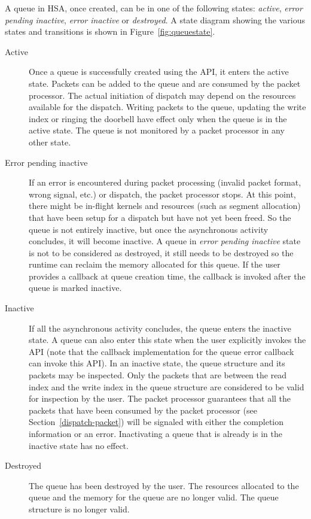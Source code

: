 \documentclass[draft]{book}
\begin{document}
A queue in HSA, once created, can be in one of the following states:
\emph{active}, \emph{error pending inactive}, \emph{error inactive} or
\emph{destroyed}. A state diagram showing the various states and transitions is
shown in Figure~\ref{fig:queuestate}.

\begin{description}
\item[Active] Once a queue is successfully created using the
   API, it enters the active state. Packets can be
  added to the queue and are consumed by the packet processor. The actual
  initiation of dispatch may depend on the resources available for the
  dispatch. Writing packets to the queue, updating the write index or ringing
  the doorbell have effect only when the queue is in the active state. The queue
  is not monitored by a packet processor in any other state.

\item[Error pending inactive] If an error is encountered during packet
  processing (invalid packet format, wrong signal, etc.) or dispatch, the packet
  processor stops. At this point, there might be in-flight kernels and resources
  (such as segment allocation) that have been setup for a dispatch but have not
  yet been freed. So the queue is not entirely inactive, but once the
  asynchronous activity concludes, it will become inactive. A queue in
  \emph{error pending inactive} state is not to be considered as destroyed, it
  still needs to be destroyed so the runtime can reclaim the memory allocated
  for this queue. If the user provides a callback at queue creation time, the
  callback is invoked after the queue is marked inactive.

\item[Inactive] If all the asynchronous activity concludes, the queue enters the
  inactive state. A queue can also enter this state when the user explicitly
  invokes the  API (note that the callback
  implementation for the queue error callback can invoke this API). In an
  inactive state, the queue structure and its packets may be inspected. Only the
  packets that are between the read index and the write index in the queue
  structure are considered to be valid for inspection by the user. The packet
  processor guarantees that all the packets that have been consumed by the
  packet processor (see Section~\ref{dispatch-packet}) will be signaled with
  either the completion information or an error. Inactivating a queue that is
  already is in the inactive state has no effect.

\item[Destroyed] The queue has been destroyed by the user. The resources
  allocated to the queue and the memory for the queue are no longer valid. The
  queue structure is no longer valid.
\end{description}
\end{document}
